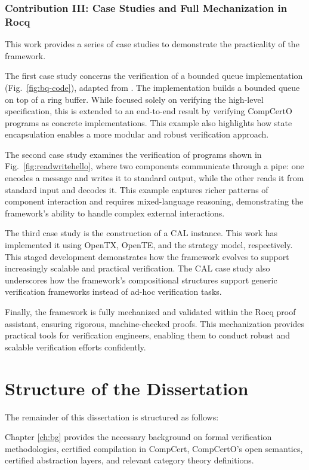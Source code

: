 \subsubsection{Contribution III: Case Studies and Full Mechanization in Rocq}

This work provides a series of case studies
to demonstrate the practicality of the framework.

The first case study concerns
the verification of a bounded queue implementation (Fig.~\ref{fig:bq-code}),
adapted from \citet{rbgs-cal}.
The implementation builds a bounded queue
on top of a ring buffer.
While \citet{rbgs-cal} focused solely
on verifying the high-level specification,
this is extended to an end-to-end result
by verifying CompCertO programs as concrete implementations.
This example also highlights
how state encapsulation enables
a more modular and robust verification approach.

The second case study
examines the verification of programs
shown in Fig.~\ref{fig:readwritehello},
where two components communicate through a pipe:
one encodes a message and writes it to standard output,
while the other reads it from standard input
and decodes it.
This example captures richer patterns of component interaction
and requires mixed-language reasoning,
demonstrating the framework's ability
to handle complex external interactions.

The third case study is
the construction of a CAL instance.
This work has implemented it
using OpenTX, OpenTE, and the strategy model,
respectively.
This staged development demonstrates
how the framework evolves
to support increasingly scalable
and practical verification.
The CAL case study also underscores
how the framework's compositional structures
support generic verification frameworks
instead of ad-hoc verification tasks.

Finally,
the framework is fully mechanized
and validated
within the Rocq proof assistant,
ensuring rigorous, machine-checked proofs.
This mechanization provides practical tools
for verification engineers,
enabling them to conduct
robust and scalable verification efforts confidently.

\section{Structure of the Dissertation}

The remainder of this dissertation is structured as follows:

Chapter \ref{ch:bg} provides the necessary background
on formal verification methodologies,
certified compilation in
CompCert, CompCertO's open semantics,
certified abstraction layers,
and relevant category theory definitions.

